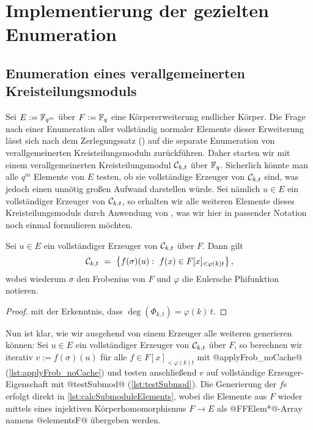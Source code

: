 \section{Implementierung der gezielten Enumeration}

\subsection{Enumeration eines verallgemeinerten Kreisteilungsmoduls}
\label{sub:enumeration_eines_verallg_kreisteilungsmoduls}

Sei $E := \mathbb{F}_{q^m}$ über $F := \mathbb{F}_q$ eine Körpererweiterung endlicher Körper. Die Frage
nach einer Enumeration aller vollständig normaler Elemente dieser Erweiterung
lässt sich nach dem Zerlegungssatz () auf die
separate Enumeration von verallgemeinerten Kreisteilungsmoduln zurückführen.
Daher starten wir mit einem verallgemeinerten Kreisteilungsmodul $\mathcal{C}_{k,t}$
über $\mathbb{F}_q$. Sicherlich könnte man alle $q^m$ Elemente von $E$ testen, ob sie
vollständige Erzeuger von $\mathcal{C}_{k,t}$ sind, was jedoch einen unnötig großen
Aufwand darstellen würde. Sei nämlich $u\in E$ ein vollständiger Erzeuger von
$\mathcal{C}_{k,t}$, so erhalten wir alle weiteren Elemente dieses Kreisteilungsmoduls
durch Anwendung von , was wir hier in passender
Notation noch einmal formulieren möchten.

\begin{lemma}
  \label{lemma:moduln_durch_polys}
  Sei $u\in E$ ein vollständiger Erzeuger von $\mathcal{C}_{k,t}$ über $F$. 
  Dann gilt
  \[ \mathcal{C}_{k,t} \ =\  \big\{ f(\sigma)(u):\ f(x) \in F[x]_{<\varphi(k)t}\big\} \,,\]
  wobei wiederum $\sigma$ den Frobenius von $F$ und 
  $\varphi$ die Eulersche Phifunktion notieren.
\end{lemma}
\begin{proof}
   mit der Erkenntnis, dass
  $\deg(\Phi_{k,t}) = \varphi(k)\,t$.
\end{proof}

Nun ist klar, wie wir ausgehend von einem Erzeuger alle weiteren generieren
können: Sei $u \in E$ ein vollständiger Erzeuger von $\mathcal{C}_{k,t}$ über $F$, so 
berechnen wir iterativ $v := f(\sigma)(u)$ für alle $f \in F[x]_{<\varphi(k)t}$
mit @applyFrob_noCache@ (\autoref{lst:applyFrob_noCache}) 
und testen anschließend $v$ auf vollständige Erzeuger-Eigenschaft mit 
@testSubmod@ (\autoref{lst:testSubmod}). 
Die Generierung der $f$s erfolgt direkt in \autoref{lst:calcSubmoduleElements},
wobei die Elemente aus $F$ wieder mittels eines injektiven Körperhomomorphismus 
$F\to E$ als @FFElem*@-Array namens @elementsF@ übergeben werden.

